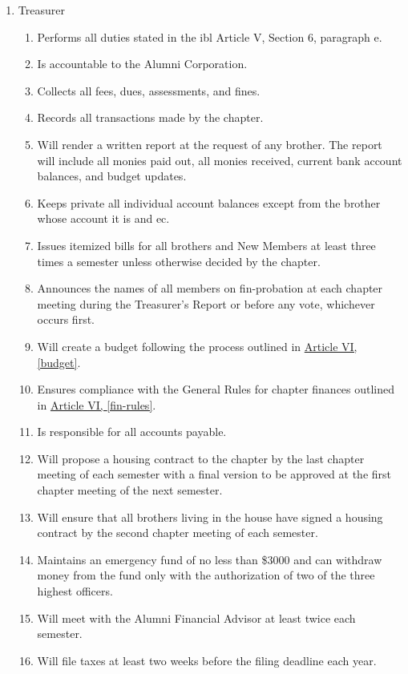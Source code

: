 \begin{enumerate}
		\item Treasurer \label{treasurer-duties}
			\begin{enumerate}
				\item Performs all duties stated in the \gls{ibl} Article V, Section 6, paragraph e.
				\item Is accountable to the Alumni Corporation.
				\item Collects all fees, dues, assessments, and fines.
				\item Records all transactions made by the chapter.
				\item Will render a written report at the request of any brother. The report will include all monies paid out, all monies received, current bank account balances, and budget updates.
				\item Keeps private all individual account balances except from the brother whose account it is and \gls{ec}.
				\item Issues itemized bills for all brothers and New Members at least three times a semester unless otherwise decided by the chapter.
				\item Announces the names of all members on \gls{fin-probation} at each chapter meeting during the Treasurer's Report or before any vote, whichever occurs first.
				\item Will create a budget following the process outlined in \hyperref[budget]{Article VI, \autoref*{budget}}.
				\item Ensures compliance with the General Rules for chapter finances outlined in \hyperref[fin-rules]{Article VI, \autoref*{fin-rules}}.
				\item Is responsible for all accounts payable.
				\item Will propose a housing contract to the chapter by the last chapter meeting of each semester with a final version to be approved at the first chapter meeting of the next semester.
				\item Will ensure that all brothers living in the house have signed a housing contract by the second chapter meeting of each semester.\label{housing-contract}
				\item Maintains an emergency fund of no less than \$3000 and can withdraw money from the fund only with the authorization of two of the three highest officers. %
				\item Will meet with the Alumni Financial Advisor at least twice each semester.
				\item Will file taxes at least two weeks before the filing deadline each year.

\end{enumerate}
\end{enumerate}
